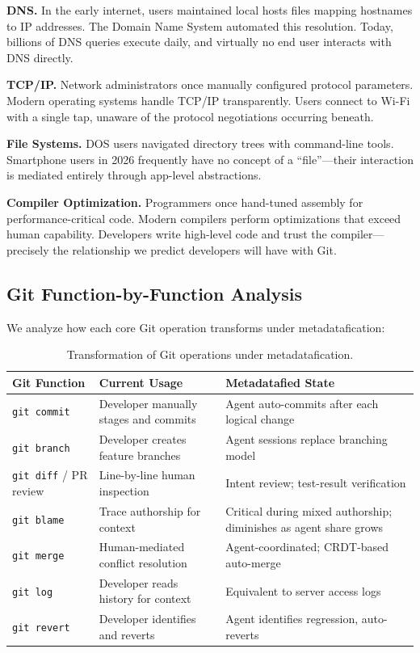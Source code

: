 \documentclass[sigconf, nonacm, anonymous=false]{acmart}
\begin{document}
\textbf{DNS.} In the early internet, users maintained local hosts files mapping hostnames to IP addresses. The Domain Name System automated this resolution. Today, billions of DNS queries execute daily, and virtually no end user interacts with DNS directly.

\textbf{TCP/IP.} Network administrators once manually configured protocol parameters. Modern operating systems handle TCP/IP transparently. Users connect to Wi-Fi with a single tap, unaware of the protocol negotiations occurring beneath.

\textbf{File Systems.} DOS users navigated directory trees with command-line tools. Smartphone users in 2026 frequently have no concept of a ``file''---their interaction is mediated entirely through app-level abstractions.

\textbf{Compiler Optimization.} Programmers once hand-tuned assembly for performance-critical code. Modern compilers perform optimizations that exceed human capability. Developers write high-level code and trust the compiler---precisely the relationship we predict developers will have with Git.

\subsection{Git Function-by-Function Analysis}

We analyze how each core Git operation transforms under metadatafication:

\begin{table}[h]
\centering
\small
\begin{tabularx}{\textwidth}{lXX}
\toprule
\textbf{Git Function} & \textbf{Current Usage} & \textbf{Metadatafied State} \\
\midrule
\texttt{git commit} & Developer manually stages and commits & Agent auto-commits after each logical change \\
\texttt{git branch} & Developer creates feature branches & Agent sessions replace branching model \\
\texttt{git diff} / PR review & Line-by-line human inspection & Intent review; test-result verification \\
\texttt{git blame} & Trace authorship for context & Critical during mixed authorship; diminishes as agent share grows \\
\texttt{git merge} & Human-mediated conflict resolution & Agent-coordinated; CRDT-based auto-merge \\
\texttt{git log} & Developer reads history for context & Equivalent to server access logs \\
\texttt{git revert} & Developer identifies and reverts & Agent identifies regression, auto-reverts \\
\bottomrule
\end{tabularx}
\caption{Transformation of Git operations under metadatafication.}
\label{tab:git-functions}
\end{table}
\end{document}
